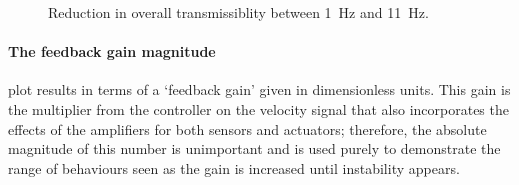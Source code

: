 \begin{figure}
  \caption{Reduction in overall transmissiblity between \SI{1}{Hz} and \SI{11}{Hz}.}
\end{figure}

\paragraph{The feedback gain magnitude}  plot
results in terms of a `feedback gain' given in dimensionless units. This gain
is the multiplier from the controller on the velocity signal that also
incorporates the effects of the amplifiers for both sensors and actuators;
therefore, the absolute magnitude of this number is unimportant and is used
purely to demonstrate the range of behaviours seen as the gain is increased
until instability appears.

